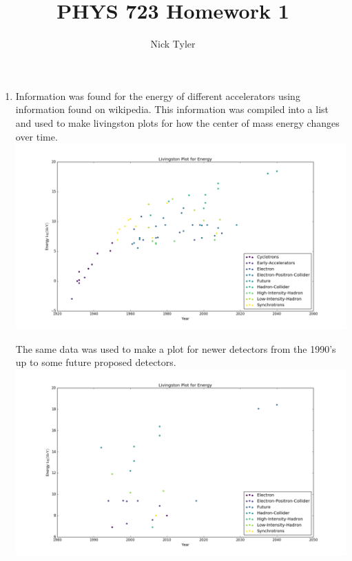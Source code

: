 \documentclass[pdftex]{article}
\title{PHYS 723 Homework 1}
\author{Nick Tyler}
\date{}
\begin{document}
\captionsetup[figure]{aboveskip=-15pt}
\captionsetup[figure]{belowskip=15pt}
\maketitle
\begin{enumerate}
	\item  Information was found for the energy of different accelerators using information
	found on wikipedia. This information was compiled into a list and used to make livingston plots
	for how the center of mass energy changes over time.\\
	\includegraphics[scale=0.35]{acc_logE.png}\\

	The same data was used to make a plot for newer detectors from the 1990's up to some future proposed detectors.
	\includegraphics[scale=0.35]{acc_logE_90.png}\\


\end{enumerate}
\end{document}
